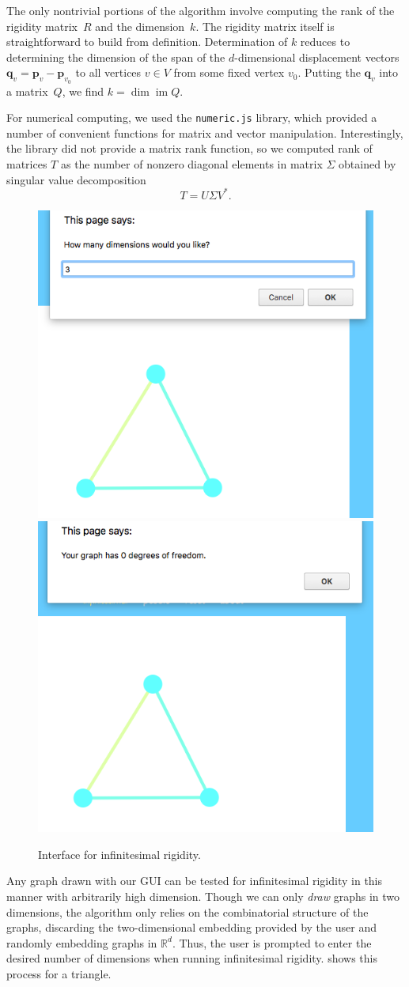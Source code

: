 \documentclass[aps,prd,final,twocolumn,letterpaper,nofootinbib]{revtex4-1}
\newcommand\RR{\mathbb{R}}
\DeclareMathOperator\im{im}
\newcommand{\mb}{\mathbf}
\begin{document}
The only nontrivial portions of the algorithm involve
computing the rank of the rigidity matrix~$R$
and the dimension~$k$.
The rigidity matrix itself is straightforward to build from definition.
Determination of $k$
reduces to determining the dimension of the span
of the $d$-dimensional displacement vectors $\mb q_v = \mb p_v - \mb p_{v_0}$
to all vertices $v\in V$ from some fixed vertex $v_0$.
Putting the $\mb q_v$ into a matrix~$Q$,
we find $k=\dim\im Q$.

For numerical computing, we used the \texttt{numeric.js} library,
which provided a number of convenient functions for matrix and vector manipulation.
Interestingly, the library did not provide a matrix rank function,
so we computed rank of matrices $T$
as the number of nonzero diagonal elements in matrix $\Sigma$
obtained by singular value decomposition
\[
    T = U\Sigma V^*.
\]

\begin{figure}[ht]
   \centering
   \includegraphics[width=.49\linewidth]{img/i1}
   \includegraphics[width=.49\linewidth]{img/i2}
   \caption{Interface for infinitesimal rigidity.}
   \label{fig:inf}
\end{figure}

Any graph drawn with our GUI can be tested for infinitesimal rigidity
in this manner with arbitrarily high dimension.
Though we can only \emph{draw} graphs in two dimensions,
the algorithm only relies on the combinatorial structure of the graphs,
discarding the two-dimensional embedding provided by the user
and randomly embedding graphs in $\RR^d$.
Thus, the user is prompted to enter the desired number of dimensions
when running infinitesimal rigidity.
 shows this process for a triangle.
\end{document}
